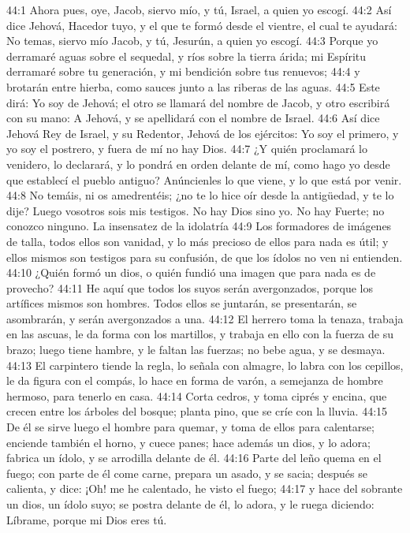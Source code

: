 44:1 Ahora pues, oye, Jacob, siervo mío, y tú, Israel, a quien yo escogí.  
44:2 Así dice Jehová, Hacedor tuyo, y el que te formó desde el vientre, el cual te ayudará: No temas, siervo mío Jacob, y tú, Jesurún, a quien yo escogí.  
44:3 Porque yo derramaré aguas sobre el sequedal, y ríos sobre la tierra árida; mi Espíritu derramaré sobre tu generación, y mi bendición sobre tus renuevos;  
44:4 y brotarán entre hierba, como sauces junto a las riberas de las aguas.  
44:5 Este dirá: Yo soy de Jehová; el otro se llamará del nombre de Jacob, y otro escribirá con su mano: A Jehová, y se apellidará con el nombre de Israel.  
44:6 Así dice Jehová Rey de Israel, y su Redentor, Jehová de los ejércitos: Yo soy el primero, y yo soy el postrero, y fuera de mí no hay Dios.  
44:7 ¿Y quién proclamará lo venidero, lo declarará, y lo pondrá en orden delante de mí, como hago yo desde que establecí el pueblo antiguo? Anúncienles lo que viene, y lo que está por venir.  
44:8 No temáis, ni os amedrentéis; ¿no te lo hice oír desde la antigüedad, y te lo dije? Luego vosotros sois mis testigos. No hay Dios sino yo. No hay Fuerte; no conozco ninguno.  
La insensatez de la idolatría  
44:9 Los formadores de imágenes de talla, todos ellos son vanidad, y lo más precioso de ellos para nada es útil; y ellos mismos son testigos para su confusión, de que los ídolos no ven ni entienden.  
44:10 ¿Quién formó un dios, o quién fundió una imagen que para nada es de provecho?  
44:11 He aquí que todos los suyos serán avergonzados, porque los artífices mismos son hombres. Todos ellos se juntarán, se presentarán, se asombrarán, y serán avergonzados a una.  
44:12 El herrero toma la tenaza, trabaja en las ascuas, le da forma con los martillos, y trabaja en ello con la fuerza de su brazo; luego tiene hambre, y le faltan las fuerzas; no bebe agua, y se desmaya.  
44:13 El carpintero tiende la regla, lo señala con almagre, lo labra con los cepillos, le da figura con el compás, lo hace en forma de varón, a semejanza de hombre hermoso, para tenerlo en casa.  
44:14 Corta cedros, y toma ciprés y encina, que crecen entre los árboles del bosque; planta pino, que se críe con la lluvia.  
44:15 De él se sirve luego el hombre para quemar, y toma de ellos para calentarse; enciende también el horno, y cuece panes; hace además un dios, y lo adora; fabrica un ídolo, y se arrodilla delante de él.  
44:16 Parte del leño quema en el fuego; con parte de él come carne, prepara un asado, y se sacia; después se calienta, y dice: ¡Oh! me he calentado, he visto el fuego;  
44:17 y hace del sobrante un dios, un ídolo suyo; se postra delante de él, lo adora, y le ruega diciendo: Líbrame, porque mi Dios eres tú.  
